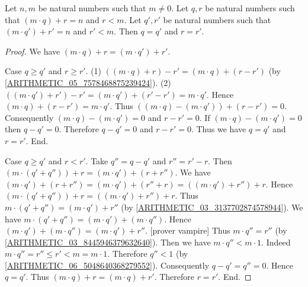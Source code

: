 \documentclass[../arithmetic.tex]{subfiles}
\begin{document}
  \begin{forthel}
    \begin{proposition}
      Let $n, m$ be natural numbers such that $m \neq 0$.
      Let $q, r$ be natural numbers such that $(m \cdot q) + r = n$ and $r < m$.
      Let $q', r'$ be natural numbers such that $(m \cdot q') + r' = n$ and
      $r' < m$.
      Then $q = q'$ and $r = r'$.
    \end{proposition}
    \begin{proof}
      We have $(m \cdot q) + r = (m \cdot q') + r'$.

      Case $q \geq q'$ and $r \geq r'$.
        (1) $((m \cdot q) + r) - r' = (m \cdot q) + (r - r')$
        (by \cref{ARITHMETIC_05_7578468875239424}).
        (2) $((m \cdot q') + r') - r'
          = (m \cdot q') + (r' - r')
          = m \cdot q'$.
        Hence $(m \cdot q) + (r - r') = m \cdot q'$.
        Thus $((m \cdot q) - (m \cdot q')) + (r - r') = 0$.
        Consequently $(m \cdot q) - (m \cdot q') = 0$ and $r - r' = 0$.
        If $(m \cdot q) - (m \cdot q') = 0$ then $q - q' = 0$.
        Therefore $q - q' = 0$ and $r - r' = 0$.
        Thus we have $q = q'$ and $r = r'$.
      End.

      Case $q \geq q'$ and $r < r'$.
        Take $q'' = q - q'$ and $r'' = r' - r$.
        Then $(m \cdot (q' + q'')) + r = (m \cdot q') + (r + r'')$.
        We have $(m \cdot q') + (r + r'')
          = (m \cdot q') + (r'' + r)
          = ((m \cdot q') + r'') + r$.
        Hence $(m \cdot (q' + q'')) + r = ((m \cdot q') + r'') + r$.
        Thus $m \cdot (q' + q'') = (m \cdot q') + r''$
        (by \cref{ARITHMETIC_03_3137702874578944}).
        We have $m \cdot (q' + q'') = (m \cdot q') + (m \cdot q'')$.
        Hence $(m \cdot q') + (m \cdot q'') = (m \cdot q') + r''$.
        [prover vampire]
        Thus $m \cdot q'' = r''$ (by \cref{ARITHMETIC_03_8445946379632640}).
        Then we have $m \cdot q'' < m \cdot 1$.
        Indeed $m \cdot q''
          = r''
          \leq r'
          < m
          = m \cdot 1$.
        Therefore $q'' < 1$ (by \cref{ARITHMETIC_06_5048640368279552}).
        Consequently $q - q' = q'' = 0$.
        Hence $q = q'$.
        Thus $(m \cdot q) + r = (m \cdot q) + r'$.
        Therefore $r = r'$.
      End.


\end{proof}
\end{forthel}
\end{document}
